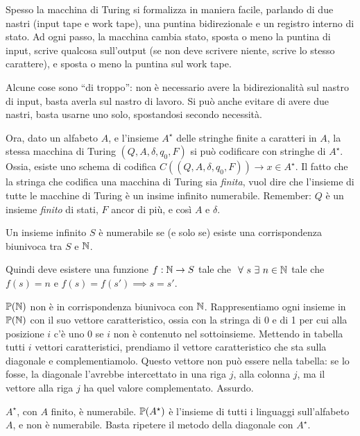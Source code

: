 Spesso la macchina di Turing si formalizza in maniera facile, parlando di due nastri (input tape e work tape), una puntina bidirezionale e un registro interno di stato. Ad ogni passo, la macchina cambia stato, sposta o meno la puntina di input, scrive qualcosa sull'output (se non deve scrivere niente, scrive lo stesso carattere), e sposta o meno la puntina sul work tape.

Alcune cose sono ``di troppo'': non \`e necessario avere la bidirezionalit\`a sul nastro di input, basta averla sul nastro di lavoro. Si pu\`o anche evitare di avere due nastri, basta usarne uno solo, spostandosi secondo necessit\`a.

Ora, dato un alfabeto $A$, e l'insieme $A^{\star}$ delle stringhe finite a caratteri in $A$, la stessa macchina di Turing $(Q, A, \delta, q_0, F)$ si pu\`o codificare con stringhe di $A^{\star}$. Ossia, esiste uno schema di codifica $C((Q, A, \delta, q_0, F)) \to x \in A^{\star}$. Il fatto che la stringa che codifica una macchina di Turing sia \emph{finita}, vuol dire che l'insieme di tutte le macchine di Turing \`e un insime infinito numerabile. Remember: $Q$ \`e un insieme \emph{finito} di stati, $F$ ancor di pi\`u, e cos\`i $A$ e $\delta$.

\begin{defn}
Un insieme infinito $S$ \`e numerabile se (e solo se) esiste una corrispondenza biunivoca tra $S$ e $\mathbb{N}$.
\end{defn}
Quindi deve esistere una funzione $f : \mathbb{N} \to S$ tale che $\forall s \exists n \in \naturals$ tale che $f(s) = n$ e $f(s) = f(s') \implies s = s'$.

$\mathbb{P} (\mathbb{N})$ non \`e in corrispondenza biunivoca con $\mathbb{N}$. Rappresentiamo ogni insieme in $\mathbb{P} (\mathbb{N})$ con il suo vettore caratteristico, ossia con la stringa di 0 e di 1 per cui alla posizione $i$ c'\`e uno 0 se $i$ non \`e contenuto nel sottoinsieme. Mettendo in tabella tutti $i$ vettori caratteristici, prendiamo il vettore caratteristico che sta sulla diagonale e complementiamolo. Questo vettore non pu\`o essere nella tabella: se lo fosse, la diagonale l'avrebbe intercettato in una riga $j$, alla colonna $j$, ma il vettore alla riga $j$ ha quel valore complementato. Assurdo.

$A^{\star}$, con $A$ finito, \`e numerabile. $\mathbb{P} (A^{\star})$ \`e l'insieme di tutti i linguaggi sull'alfabeto $A$, e non \`e numerabile. Basta ripetere il metodo della diagonale con $A^{\star}$.

